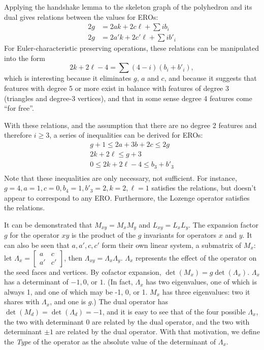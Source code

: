 \documentclass[12pt]{amsart}%
\begin{document}
Applying the handshake lemma to the skeleton graph of the polyhedron and its dual gives relations between the values for EROs:
\begin{equation}
  \begin{split}
   2g &= 2ak + 2c\ell + \sum i b_i \\
   2g &= 2a'k + 2c'\ell + \sum i b'_i
 \end{split}
\end{equation}
For Euler-characteristic preserving operations, these relations can be
manipulated into the form
\begin{equation}
  2k + 2\ell - 4 = \sum (4-i) (b_i + b'_i),
\end{equation}
which is interesting because it eliminates $g$, $a$ and $c$,
and because it suggests that features with degree 5 or more exist
in balance with features of degree 3 (triangles and degree-3 vertices),
and that in some sense degree 4 features come ``for free''.

With these relations, and the assumption that there are no degree 2 features
and therefore $i \ge 3$, a series of inequalities can be derived for EROs:
\begin{equation}
  \begin{split}
  g + 1 \le 2a + 3b + 2c \le 2g \\
  2k + 2\ell \le g + 3 \\
  0 \le 2k + 2\ell - 4 \le b_3 + b'_3 \\
  \end{split}
\end{equation}
Note that these inequalities are only necessary, not sufficient. For instance,
$g=4, a=1, c=0, b_4 = 1, b'_3=2, k=2, \ell=1$ satisfies the relations, but
doesn't appear to correspond to any ERO. Furthermore, the Lozenge operator
satisfies the relations.

It can be demonstrated that $M_{xy} = M_{x}M_{y}$ and $L_{xy} = L_{x}L_{y}$.
The expansion factor $g$ for the operator $xy$ is the product of the $g$
invariants for operators $x$ and $y$. It can also be seen that $a, a', c, c'$
form their own linear system, a submatrix of $M_x$: let $\Lambda_x =
\begin{bmatrix} a & c \\ a' & c' \end{bmatrix}$, then $\Lambda_{xy} = \Lambda_x
\Lambda_y$. $\Lambda_x$ represents the effect of the operator on the seed
faces and vertices. By cofactor expansion, $\det (M_x) = g \det (\Lambda_x)$.
$\Lambda_x$ has a determinant of $-1, 0$, or $1$. (In fact, $\Lambda_x$ has two
eigenvalues, one of which is always 1, and one of which may be -1, 0, or 1.
$M_x$ has three eigenvalues: two it shares with $\Lambda_x$, and one is $g$.)
The dual operator has $\det (M_d) = \det (\Lambda_d) = -1$, and it is easy to
see that of the four possible $\Lambda_x$, the two with determinant 0 are
related by the dual operator, and the two with determinant $\pm 1$ are related
by the dual operator. With that motivation, we define the \textit{Type} of the
operator as the absolute value of the determinant of $\Lambda_x$.
\end{document}
